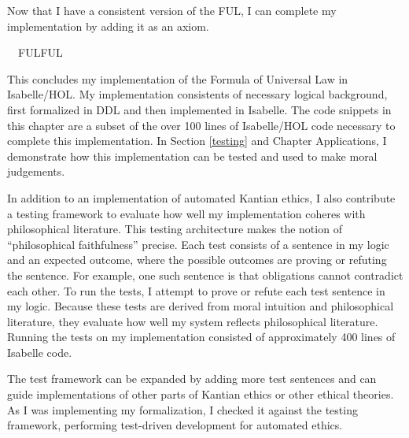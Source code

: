 \begin{isabellebody}
\begin{isamarkuptext}
Now that I have a consistent version of the FUL, I can complete my implementation by adding it as an axiom.%
\end{isamarkuptext}\isamarkuptrue%
\isamarkupfalse%
\ \ FUL{\isacharcolon}FUL%
\begin{isamarkuptext}%
This concludes my implementation of the Formula of Universal Law in Isabelle/HOL. My implementation
consistents of necessary logical background, first formalized in DDL and then implemented in Isabelle.
The code snippets in this chapter are a subset of the over 100 lines of Isabelle/HOL code necessary to
complete this implementation. In Section \ref{testing} and Chapter Applications, I demonstrate how this
implementation can be tested and used to make moral judgements.%
\end{isamarkuptext}\isamarkuptrue%
%
\isadelimdocument
%
\endisadelimdocument
%
\isatagdocument
%
\isamarkuptrue%
%
\endisatagdocument
{\isafolddocument}%
%
\isadelimdocument
%
\endisadelimdocument
%
\begin{isamarkuptext}%
In addition to an implementation of automated Kantian ethics, I also contribute a testing framework 
to evaluate how well my implementation coheres with philosophical literature. This testing architecture 
makes the notion of ``philosophical faithfulness'' precise. Each test consists of a sentence in my logic 
and an expected outcome, where the possible outcomes are proving or refuting the sentence. For example, 
one such sentence is that obligations cannot contradict each other. To run the tests, I attempt to
 prove or refute each test sentence in my logic.  Because these tests are derived from moral 
intuition and philosophical literature, they evaluate how well my system reflects philosophical
literature. Running the tests on my implementation consisted of approximately 400 lines of Isabelle code.

The test framework can be expanded by adding more test sentences and can guide 
implementations of other parts of Kantian ethics or other ethical theories. As I was implementing my 
formalization, I checked it against the testing framework, performing test-driven development for automated 
ethics.


\end{isamarkuptext}
\end{isabellebody}

